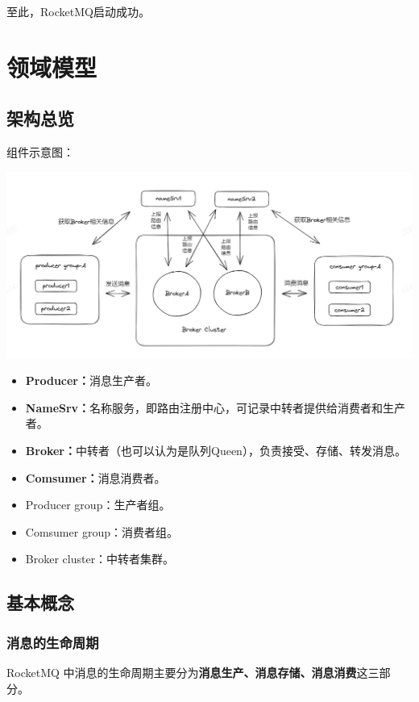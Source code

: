 \documentclass[11pt, a4paper, oneside, fontset=none]{ctexbook}
\begin{document}
至此，RocketMQ启动成功。

\chapter{领域模型}
\section{架构总览}
组件示意图：
\begin{center}
  \begin{minipage}{\textwidth}
    \center
    \includegraphics[width=\textwidth]{picture/RocketMQ全局图.jpg}
    \captionsetup{hypcap=false}
    \label{fig:RocketMQ全局图}
  \end{minipage}
\end{center}

\begin{itemize}
  \item {\bfseries\kaishu Producer：}消息生产者。
  \item {\bfseries\kaishu NameSrv：}名称服务，即路由注册中心，可记录中转者提供给消费者和生产者。
  \item {\bfseries\kaishu Broker：}中转者（也可以认为是队列Queen），负责接受、存储、转发消息。
  \item {\bfseries\kaishu Comsumer：}消息消费者。
  \item Producer group：生产者组。
  \item Comsumer group：消费者组。
  \item Broker cluster：中转者集群。
\end{itemize}

\section{基本概念}

\subsection{消息的生命周期}
RocketMQ 中消息的生命周期主要分为{\bfseries\kaishu 消息生产、消息存储、消息消费}这三部分。
\end{document}
